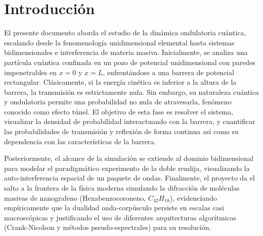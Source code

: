 \section{Introducción}

El presente documento aborda el estudio de la dinámica ondulatoria cuántica, escalando desde la fenomenología unidimensional elemental hasta sistemas bidimensionales e interferencia de materia masiva. Inicialmente, se analiza una partícula cuántica confinada en un pozo de potencial unidimensional con paredes impenetrables en $x=0$ y $x=L$, enfrentándose a una barrera de potencial rectangular. Clásicamente, si la energía cinética es inferior a la altura de la barrera, la transmisión es estrictamente nula. Sin embargo, su naturaleza cuántica y ondulatoria permite una probabilidad no nula de atravesarla, fenómeno conocido como efecto túnel. El objetivo de esta fase es resolver el sistema, visualizar la densidad de probabilidad interactuando con la barrera, y cuantificar las probabilidades de transmisión y reflexión de forma continua así como su dependencia con las características de la barrera.

Posteriormente, el alcance de la simulación se extiende al dominio bidimensional para modelar el paradigmático experimento de la doble rendija, visualizando la auto-interferencia espacial de un paquete de ondas. Finalmente, el proyecto da el salto a la frontera de la física moderna simulando la difracción de moléculas masivas de nanografeno (Hexabenzocoroneno, $C_{42}H_{18}$), evidenciando empíricamente que la dualidad onda-corpúsculo persiste en escalas casi macroscópicas y justificando el uso de diferentes arquitecturas algorítmicas (Crank-Nicolson y métodos pseudo-espectrales) para su resolución.